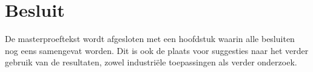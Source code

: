 \chapter{Besluit}
\label{besluit}

De masterproeftekst wordt afgesloten met een hoofdstuk waarin alle
besluiten nog eens samengevat worden. Dit is ook de plaats voor suggesties
naar het verder gebruik van de resultaten, zowel industri\"ele toepassingen
als verder onderzoek.

